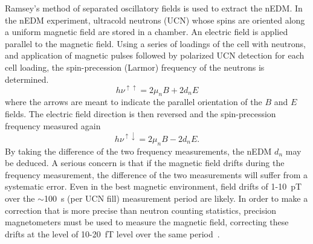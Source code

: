 Ramsey's method of separated oscillatory fields \cite{bib:ramsey} is
used to extract the nEDM.  In the nEDM experiment, ultracold neutrons
(UCN) whose spins are oriented along a uniform magnetic field are
stored in a chamber.  An electric field is applied parallel to the
magnetic field.
Using a series of loadings of the cell with neutrons, and application
of magnetic pulses followed by polarized UCN detection for each cell
loading, the spin-precession (Larmor) frequency of the neutrons is
determined.
\begin{equation}\label{my_first_eqn}  
    h\nu^{\uparrow\uparrow}=2\mu_nB+2d_nE
\end{equation}
where the arrows are meant to indicate the parallel orientation of the $B$ and $E$ fields.  The electric field direction is then reversed and the spin-precession frequency measured again
\begin{equation}\label{my_first_eqn}  
    h\nu^{\uparrow\downarrow}=2\mu_nB-2d_nE.
\end{equation}
By taking the difference of the two frequency measurements, the nEDM
$d_n$ may be deduced.
A serious concern is that if the magnetic field drifts during the
frequency measurement, the difference of the two measurements will
suffer from a systematic error.  Even in the best magnetic
environment, field drifts of 1-10~pT over the $\sim$100~s (per UCN
fill) measurement period are likely.  In order to make a correction
that is more precise than neutron counting statistics, precision
magnetometers must be used to measure the magnetic field, correcting
these drifts at the level of 10-20~fT level over the same
period~\cite{bib:mike-langs-msc-thesis}.

